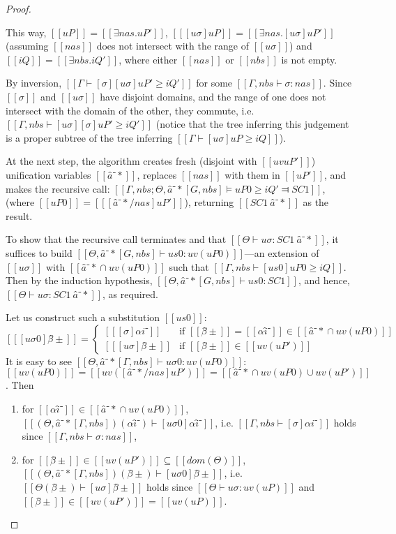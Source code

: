 \begin{proof}
\begin{caseof}
            This way, $[[uP]] = [[∃nas.uP']]$, $[[ [uσ]uP ]] = [[ ∃nas.[uσ]uP' ]]$ 
            (assuming $[[nas]]$ does not intersect with the range of $[[uσ]]$)
            and $[[iQ]] = [[ ∃nbs.iQ' ]]$, where either $[[nas]]$ or $[[nbs]]$ is not empty.

            By inversion, $[[ Γ ⊢ [σ][uσ]uP' ≥ iQ' ]]$ for some $[[Γ, nbs ⊢ σ :{nas}]]$.
            Since $[[σ]]$ and $[[uσ]]$ have disjoint domains,
            and the range of one does not intersect with the domain of the other,
            they commute, i.e. $[[ Γ, nbs ⊢ [uσ][σ]uP' ≥ iQ' ]]$
            (notice that the tree inferring this judgement is 
            a proper subtree of the tree inferring 
            $[[ Γ ⊢ [uσ]uP ≥ iQ ]]$).

            At the next step, 
            the algorithm creates fresh (disjoint with $[[uv uP']]$) 
            unification variables $[[â⁻*]]$, replaces $[[nas]]$ with them in $[[ uP' ]]$,
            and makes the recursive call:
            $[[Γ, nbs; Θ, â⁻*[G, nbs] ⊨ uP0 ≥ iQ' ⫤ SC1]]$,
            (where $[[uP0]] = [[ [â⁻*/nas]uP' ]]$),
            returning $[[SC1 \ {â⁻*}]]$ as the result.

            To show that the recursive call terminates and that 
            $[[ Θ ⊢ uσ : SC1 \ {â⁻*} ]]$,
            it suffices to build $[[Θ, â⁻*[G, nbs] ⊢ us0 : uv(uP0)]]$---an extension of $[[uσ]]$ with
            $[[{â⁻*} ∩ uv(uP0)]]$ such that $[[Γ, nbs ⊢ [us0]uP0 ≥ iQ]]$.
            Then by the induction hypothesis, $[[Θ, â⁻*[G, nbs] ⊢ us0 : SC1]]$,
            and hence, $[[ Θ  ⊢ uσ : SC1 \ {â⁻*} ]]$, as required.

            Let us construct such a substitution $[[us0]]$:
                \[
                    [[ [uσ0]β̂± ]]  = 
                    \begin{cases}
                    [[ [σ]αi⁻ ]] & \text{if } [[β̂±]] = [[αî⁻]] \in [[{â⁻*} ∩ uv(uP0)]] \\
                    [[ [uσ]β̂± ]] & \text{if } [[β̂±]] \in [[ uv(uP') ]]
                    \end{cases}
            \]
            It is easy to see $[[Θ, â⁻*[Γ, nbs] ⊢ uσ0 : uv(uP0)]]$:
            $[[uv(uP0)]] = [[ uv([â⁻*/nas]uP') ]] = [[{â⁻*} ∩ uv(uP0) ∪ uv(uP')]]$. Then
            \begin{enumerate}
                    \item for $[[αî⁻]] \in [[{â⁻*} ∩ uv(uP0)]]$, $[[ (Θ, â⁻*[Γ, nbs])(αî⁻) ⊢ [uσ0] αî⁻]]$, 
                    i.e. $[[ Γ, nbs ⊢ [σ]αi⁻ ]]$ holds since $[[Γ, nbs ⊢ σ :{nas}]]$,
                    \item for $[[β̂±]] \in [[ uv(uP') ]] \subseteq [[dom(Θ)]]$, $[[ (Θ, â⁻*[Γ, nbs])(β̂±) ⊢ [uσ0] β̂± ]]$,
                    i.e. $[[Θ(β̂±) ⊢ [uσ] β̂± ]]$ holds since $[[Θ ⊢ uσ : uv(uP)]]$ and $[[β̂±]] \in [[ uv(uP') ]] = [[uv(uP)]]$.
            \end{enumerate}


\end{caseof}
\end{proof}
